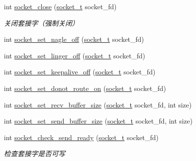 \begin{DoxyCompactItemize}
\item 
int \hyperlink{a00099_a3972a34b212a86a683834f05ed37034f_a3972a34b212a86a683834f05ed37034f}{socket\+\_\+close} (\hyperlink{a00066_a0d9e0afbf02fb6ed6c5b1415dce51b05_a0d9e0afbf02fb6ed6c5b1415dce51b05}{socket\+\_\+t} socket\+\_\+fd)
\begin{DoxyCompactList}\small\item\em 关闭套接字（强制关闭） \end{DoxyCompactList}\item 
int \hyperlink{a00099_ac38b97ead3e51bdc95124910f3657c8a_ac38b97ead3e51bdc95124910f3657c8a}{socket\+\_\+set\+\_\+nagle\+\_\+off} (\hyperlink{a00066_a0d9e0afbf02fb6ed6c5b1415dce51b05_a0d9e0afbf02fb6ed6c5b1415dce51b05}{socket\+\_\+t} socket\+\_\+fd)
\item 
int \hyperlink{a00099_ae3f2774813f23e084f5268d51e6c4983_ae3f2774813f23e084f5268d51e6c4983}{socket\+\_\+set\+\_\+linger\+\_\+off} (\hyperlink{a00066_a0d9e0afbf02fb6ed6c5b1415dce51b05_a0d9e0afbf02fb6ed6c5b1415dce51b05}{socket\+\_\+t} socket\+\_\+fd)
\item 
int \hyperlink{a00099_aeaa8128921474edb7c47efb40c8383ff_aeaa8128921474edb7c47efb40c8383ff}{socket\+\_\+set\+\_\+keepalive\+\_\+off} (\hyperlink{a00066_a0d9e0afbf02fb6ed6c5b1415dce51b05_a0d9e0afbf02fb6ed6c5b1415dce51b05}{socket\+\_\+t} socket\+\_\+fd)
\item 
int \hyperlink{a00099_a1d090d32a5cdf8b76b9e8eb650dfab60_a1d090d32a5cdf8b76b9e8eb650dfab60}{socket\+\_\+set\+\_\+donot\+\_\+route\+\_\+on} (\hyperlink{a00066_a0d9e0afbf02fb6ed6c5b1415dce51b05_a0d9e0afbf02fb6ed6c5b1415dce51b05}{socket\+\_\+t} socket\+\_\+fd)
\item 
int \hyperlink{a00099_ae2d51397a3f343ea4daaf96b4d203f73_ae2d51397a3f343ea4daaf96b4d203f73}{socket\+\_\+set\+\_\+recv\+\_\+buffer\+\_\+size} (\hyperlink{a00066_a0d9e0afbf02fb6ed6c5b1415dce51b05_a0d9e0afbf02fb6ed6c5b1415dce51b05}{socket\+\_\+t} socket\+\_\+fd, int size)
\item 
int \hyperlink{a00099_a8489cd06398f759fff9660006dc8c10d_a8489cd06398f759fff9660006dc8c10d}{socket\+\_\+set\+\_\+send\+\_\+buffer\+\_\+size} (\hyperlink{a00066_a0d9e0afbf02fb6ed6c5b1415dce51b05_a0d9e0afbf02fb6ed6c5b1415dce51b05}{socket\+\_\+t} socket\+\_\+fd, int size)
\item 
int \hyperlink{a00099_a8afd26cc26824e35f1ec942d2c367c2b_a8afd26cc26824e35f1ec942d2c367c2b}{socket\+\_\+check\+\_\+send\+\_\+ready} (\hyperlink{a00066_a0d9e0afbf02fb6ed6c5b1415dce51b05_a0d9e0afbf02fb6ed6c5b1415dce51b05}{socket\+\_\+t} socket\+\_\+fd)
\begin{DoxyCompactList}\small\item\em 检查套接字是否可写 \end{DoxyCompactList}\item 

\end{DoxyCompactItemize}
